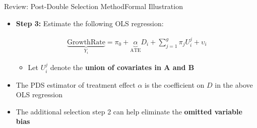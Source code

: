 \documentclass[hyperref={pdfpagelabels=false}]{beamer}
\begin{document}
\begin{frame}{Review: Post-Double Selection Method}{Formal Illustration}
\begin{itemize}

\item \textbf{Step 3:} Estimate the following OLS regression:

\begin{eqnarray*}
\underbrace{\mbox{GrowthRate}}_{Y_{i}} = \pi_{0} + \underbrace{ \alpha}_{\mbox{ATE}}  D_{i} + \sum^{g}_{j=1} \pi_{j} U^{j}_{i}  + \upsilon_{i}
\end{eqnarray*}	






\begin{itemize}
\item Let $U^{j}_{i}$ denote the \textbf{union of covariates in A and B}
\end{itemize}
\vspace{0.3cm}
\item The PDS estimator of treatment effect $\alpha$ is the coefficient on $D$ in the above OLS regression
\vspace{0.2cm}
	\item The additional selection step 2 can help eliminate the \textbf{omitted variable bias}



\end{itemize}



\end{frame}
\end{document}
